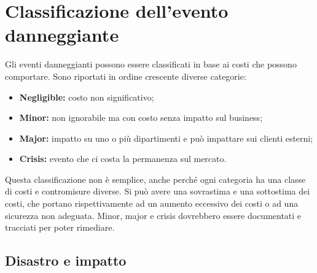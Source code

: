 \section{Classificazione dell'evento danneggiante}

Gli eventi danneggianti possono essere classificati in base ai costi
che possono comportare. Sono riportati in ordine crescente diverse categorie:

\begin{itemize}
\item \textbf{Negligible:} costo non significativo;
\item \textbf{Minor:} non ignorabile ma con costo senza impatto sul business;
\item \textbf{Major:} impatto su uno o più dipartimenti e può impattare sui clienti esterni;
\item \textbf{Crisis:} evento che ci costa la permanenza sul mercato.
\end{itemize}

Questa classificazione non è semplice, anche perché ogni categoria ha una
classe di costi e contromisure diverse. Si può avere una sovrastima e una
sottostima dei costi, che portano rispettivamente ad un aumento eccessivo
dei costi o ad una sicurezza non adeguata.
Minor, major e crisis dovrebbero essere documentati e tracciati per poter
rimediare.

\subsection{Disastro e impatto}

